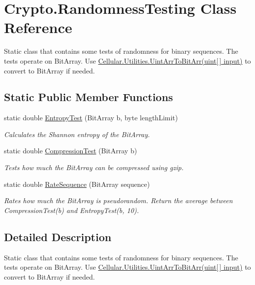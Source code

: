 \hypertarget{class_crypto_1_1_randomness_testing}{}\section{Crypto.\+Randomness\+Testing Class Reference}
\label{class_crypto_1_1_randomness_testing}


Static class that contains some tests of randomness for binary sequences. The tests operate on Bit\+Array. Use {\ttfamily \hyperlink{class_cellular_1_1_utilities_a3e6d6ebde1b445f03d3c0b1a9c0274e6}{Cellular.\+Utilities.\+Uint\+Arr\+To\+Bit\+Arr(uint\mbox{[}$\,$\mbox{]} input)}} to convert to Bit\+Array if needed.  


\subsection*{Static Public Member Functions}
\begin{DoxyCompactItemize}
\item 
static double \hyperlink{class_crypto_1_1_randomness_testing_a86ef256c8a7c87df3fdbbf5673465cb0}{Entropy\+Test} (Bit\+Array b, byte length\+Limit)
\begin{DoxyCompactList}\small\item\em Calculates the Shannon entropy of the Bit\+Array. \end{DoxyCompactList}\item 
static double \hyperlink{class_crypto_1_1_randomness_testing_af903b13649b40d4895243f51c62341cc}{Compression\+Test} (Bit\+Array b)
\begin{DoxyCompactList}\small\item\em Tests how much the Bit\+Array can be compressed using gzip. \end{DoxyCompactList}\item 
static double \hyperlink{class_crypto_1_1_randomness_testing_a34e225189cd735e8cfa82f6ab3b7d97f}{Rate\+Sequence} (Bit\+Array sequence)
\begin{DoxyCompactList}\small\item\em Rates how much the Bit\+Array is pseudorandom. Return the average between {\ttfamily Compression\+Test(b)} and {\ttfamily Entropy\+Test(b, 10).} \end{DoxyCompactList}\end{DoxyCompactItemize}


\subsection{Detailed Description}
Static class that contains some tests of randomness for binary sequences. The tests operate on Bit\+Array. Use {\ttfamily \hyperlink{class_cellular_1_1_utilities_a3e6d6ebde1b445f03d3c0b1a9c0274e6}{Cellular.\+Utilities.\+Uint\+Arr\+To\+Bit\+Arr(uint\mbox{[}$\,$\mbox{]} input)}} to convert to Bit\+Array if needed. 



